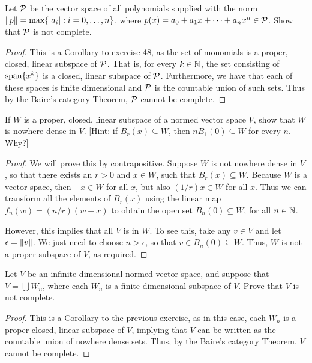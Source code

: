 \begin{exercise}{47}
Let $\mathcal{P}$ be the vector space of all polynomials supplied with the norm $\left\lVert p\right\rVert = \max\{\left\lvert a_i\right\rvert: i=0,\dots,n\}$, where $p(x) = a_0 + a_1x + \dots + a_nx^n \in \mathcal{P}$.
Show that $\mathcal{P}$ is not complete.
\end{exercise}
\begin{proof}
This is a Corollary to exercise 48, as the set of monomials is a proper, closed, linear subspace of $\mathcal{P}$.
That is, for every $k\in\mathbb{N}$, the set consisting of $\operatorname*{span}\{x^k\}$ is a closed, linear subspace of $\mathcal{P}$.
Furthermore, we have that each of these spaces is finite dimensional and $\mathcal{P}$ is the countable union of such sets.
Thus by the Baire's category Theorem, $\mathcal{P}$ cannot be complete. 
\end{proof} 

\begin{exercise}{48}
If $W$ is a proper, closed, linear subspace of a normed vector space $V$, show that $W$ is nowhere dense in $V$.
[Hint: if $B_r(x) \subseteq W$, then $nB_1(0) \subseteq W$ for every $n$.
Why?]
\end{exercise}
\begin{proof}
We will prove this by contrapositive.
Suppose $W$ is not nowhere dense in $V$, so that there exists an $r>0$ and $x\in W$, such that $B_r(x) \subseteq W$.
Because $W$ is a vector space, then $-x \in W$ for all $x$, but also $(1/r)x \in W$ for all $x$.
Thus we can transform all the elements of $B_r(x)$ using the linear map $f_n(w) = (n/r)(w-x)$ to obtain the open set $B_n(0) \subseteq W$, for all $n\in\mathbb{N}$.

However, this implies that all $V$ is in $W$.
To see this, take any $v\in V$ and let $\epsilon = \left\lVert v\right\rVert$.
We just need to choose $n>\epsilon$, so that $v \in B_n(0) \subseteq W$.
Thus, $W$ is not a proper subspace of $V$, as required.
\end{proof} 

\begin{exercise}{49}
Let $V$ be an infinite-dimensional normed vector space, and suppose that $V = \bigcup W_n$, where each $W_n$ is a finite-dimensional subspace of $V$.
Prove that $V$ is not complete.
\end{exercise}
\begin{proof}
This is a Corollary to the previous exercise, as in this case, each $W_n$ is a proper closed, linear subspace of $V$, implying that $V$ can be written as the countable union of nowhere dense sets.
Thus, by the Baire's category Theorem, $V$ cannot be complete.
\end{proof} 
